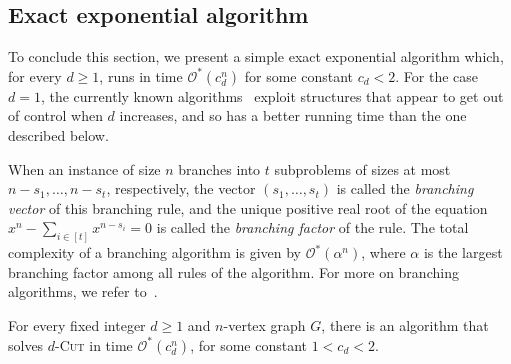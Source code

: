 \documentclass[a4paper,UKenglish,cleveref, autoref]{lipics-v2019}
\newcommand{\bigOs}[1]{\mathcal{O}^*\!\left(#1\right)}
\newcommand{\pname}[1]{\textsc{#1}}
\newcommand{\tdef}[1]{\emph{#1}}
\begin{document}
\subsection{Exact exponential algorithm}
\label{sec:exact-algo}

To conclude this section, we present a simple exact exponential algorithm which, for every $d \geq 1$, runs in time $\bigOs{c_d^n}$ for some constant $c_d < 2$.
For the case $d=1$, the currently known algorithms~\cite{matching_cut_tcs,matching_cut_ipec} exploit structures that appear to get out of control when $d$ increases, and so has a better running time than the one described below.

When an instance of size $n$ branches into $t$ subproblems of sizes at most $n - s_1, \dots, n - s_t$, respectively, the vector $(s_1, \dots, s_t)$ is called the \tdef{branching vector} of this branching rule, and the unique positive real root of the equation $x^n - \sum_{i \in [t]} x^{n - s_i} = 0$ is called the \tdef{branching factor} of the rule.
The total complexity of a branching algorithm is given by $\bigOs{\alpha^n}$, where $\alpha$ is the largest branching factor among all rules of the algorithm.
For more on branching algorithms, we refer to~\cite{exact_exponential_algorithms}.

\begin{theorem}
    For every fixed integer $d \geq 1$ and $n$-vertex graph $G$, there is an algorithm that solves \pname{$d$-Cut} in time $\bigOs{c_d^n}$, for some constant $1 < c_d < 2$.
\end{theorem}
\end{document}
